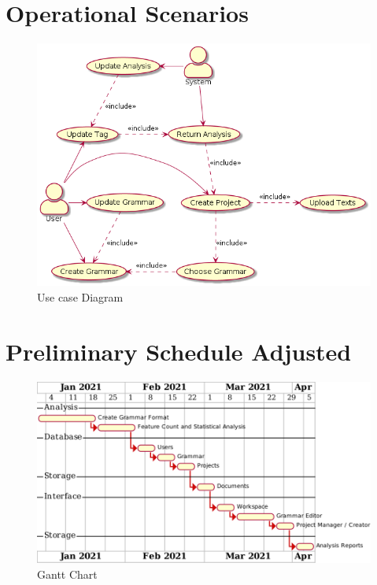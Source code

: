 \section{Operational Scenarios}
\begin{figure}[H]
    \includegraphics[width=15cm]{images/usecase.png}
    \caption{Use case Diagram}
\end{figure}

\section{Preliminary Schedule Adjusted}
\begin{figure}[H]
    \includegraphics[width=15cm]{images/gantt.png}
    \caption{Gantt Chart}
\end{figure}


